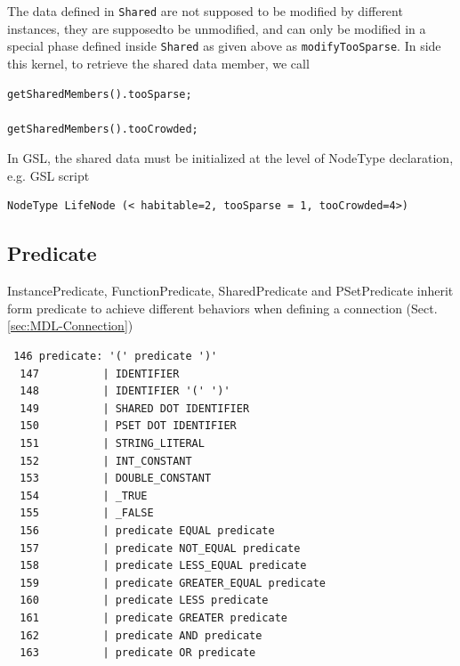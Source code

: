 The data defined in \verb!Shared! are not supposed to be modified by different
instances, they are supposedto be unmodified, and can only be modified in a
special phase defined inside \verb!Shared! as given above as
\verb!modifyTooSparse!. 
In side this kernel, to retrieve the shared data member, we call
\begin{verbatim}
getSharedMembers().tooSparse;

getSharedMembers().tooCrowded;
\end{verbatim}

In GSL, the shared data must be initialized at the level of NodeType
declaration, e.g. GSL script
\begin{verbatim}
NodeType LifeNode (< habitable=2, tooSparse = 1, tooCrowded=4>)
\end{verbatim}

\subsection{Predicate}
\label{sec:MDL-predicate}

InstancePredicate, FunctionPredicate, SharedPredicate and PSetPredicate inherit
form predicate to achieve different behaviors when defining a connection
(Sect.\ref{sec:MDL-Connection})

\begin{verbatim}
 146 predicate: '(' predicate ')'
  147          | IDENTIFIER
  148          | IDENTIFIER '(' ')'
  149          | SHARED DOT IDENTIFIER
  150          | PSET DOT IDENTIFIER
  151          | STRING_LITERAL
  152          | INT_CONSTANT
  153          | DOUBLE_CONSTANT
  154          | _TRUE
  155          | _FALSE
  156          | predicate EQUAL predicate
  157          | predicate NOT_EQUAL predicate
  158          | predicate LESS_EQUAL predicate
  159          | predicate GREATER_EQUAL predicate
  160          | predicate LESS predicate
  161          | predicate GREATER predicate
  162          | predicate AND predicate
  163          | predicate OR predicate

\end{verbatim}

